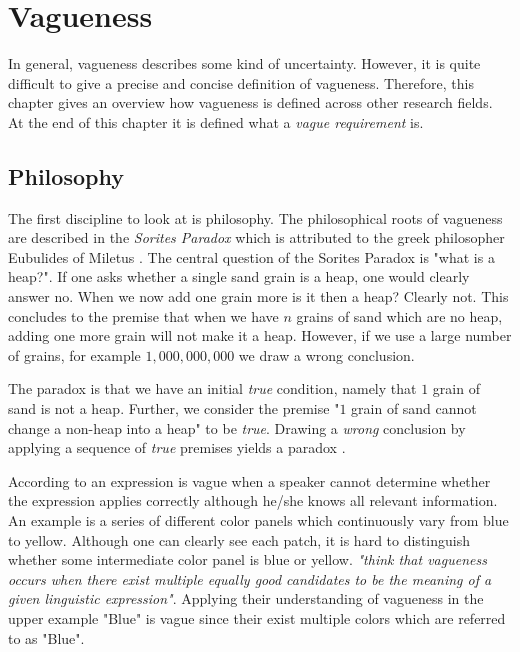 \section{Vagueness}
\label{chp:fundamentals:sec:vagueness}
In general, vagueness describes some kind of uncertainty.
However, it is quite difficult to give a precise and concise definition of vagueness.
Therefore, this chapter gives an overview how vagueness is defined across other research fields.
At the end of this chapter it is defined what a \textit{vague requirement} is.

\subsection{Philosophy}
\label{chp:fundamentals:sec:vagueness:subsec:philosophy}

The first discipline to look at is philosophy.
The philosophical roots of vagueness are described in the \textit{Sorites Paradox} which is attributed to the greek philosopher Eubulides of Miletus \parencite{Barnes:1982}.
The central question of the Sorites Paradox is "what is a heap?".
If one asks whether a single sand grain is a heap, one would clearly answer no.
When we now add one grain more is it then a heap?
Clearly not.
This concludes to the premise that when we have $n$ grains of sand which are no heap, adding one more grain will not make it a heap.
However, if we use a large number of grains, for example $1,000,000,000$ we draw a wrong conclusion.

The paradox is that we have an initial \textit{true} condition, namely that $1$ grain of sand is not a heap.
Further, we consider the premise "$1$ grain of sand cannot change a non-heap into a heap" to be \textit{true}.
Drawing a \textit{wrong} conclusion by applying a sequence of \textit{true} premises yields a paradox \parencite{Sainsbury:2009}.

According to \textcite{Braun:2007} an expression is vague when a speaker cannot determine whether the expression applies correctly although he/she knows all relevant information.
An example is a series of different color panels which continuously vary from blue to yellow.
Although one can clearly see each patch, it is hard to distinguish whether some intermediate color panel is blue or yellow.
\Textcite{Braun:2007} \textit{"think that vagueness occurs when there exist multiple equally good candidates to be the meaning of a given linguistic expression"}.
Applying their understanding of vagueness in the upper example "Blue" is vague since their exist multiple colors which are referred to as "Blue".

